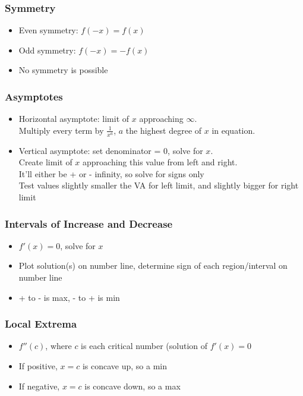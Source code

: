 \documentclass[a4paper,12pt]{article}
\begin{document}
\subsubsection{Symmetry}
\begin{itemize}
    \item{Even symmetry: $f(-x) = f(x)$}
    \item{Odd symmetry: $f(-x) = -f(x)$}
    \item{No symmetry is possible}
\end{itemize}

\subsubsection{Asymptotes}
\begin{itemize}
    \item{Horizontal asymptote: limit of $x$ approaching $\infty$. \\Multiply every term by $\frac{1}{x^a}$, $a$ the highest degree of $x$ in equation. }
    \item{Vertical asymptote: set denominator = 0, solve for $x$. \\Create limit of $x$ approaching this value from left and right. \\It'll either be + or - infinity, so solve for signs only\\ Test values slightly smaller the VA for left limit, and slightly bigger for right limit}
\end{itemize}

\subsubsection{Intervals of Increase and Decrease}
\begin{itemize}
    \item{$f'(x) = 0$, solve for $x$}
    \item{Plot solution(s) on number line, determine sign of each region/interval on number line}
    \item{+ to - is max, - to + is min}
\end{itemize}

\subsubsection{Local Extrema}
\begin{itemize}
    \item{$f''(c)$, where $c$ is each critical number (solution of $f'(x) = 0$}
    \item{If positive, $x=c$ is concave up, so a min}
    \item{If negative, $x=c$ is concave down, so a max}
\end{itemize}
\end{document}
